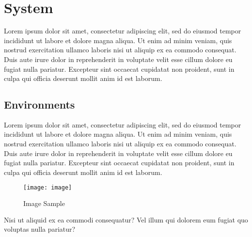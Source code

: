 \section{System}

Lorem ipsum dolor sit amet, consectetur adipiscing elit, sed do eiusmod tempor incididunt ut labore et dolore magna aliqua. Ut enim ad minim veniam, quis nostrud exercitation ullamco laboris nisi ut aliquip ex ea commodo consequat. Duis aute irure dolor in reprehenderit in voluptate velit esse cillum dolore eu fugiat nulla pariatur. Excepteur sint occaecat cupidatat non proident, sunt in culpa qui officia deserunt mollit anim id est laborum.


\subsection{Environments}

Lorem ipsum dolor sit amet, consectetur adipiscing elit, sed do eiusmod tempor incididunt ut labore et dolore magna aliqua. Ut enim ad minim veniam, quis nostrud exercitation ullamco laboris nisi ut aliquip ex ea commodo consequat. Duis aute irure dolor in reprehenderit in voluptate velit esse cillum dolore eu fugiat nulla pariatur. Excepteur sint occaecat cupidatat non proident, sunt in culpa qui officia deserunt mollit anim id est laborum.


\hfill

\begin{figure}[h]
\caption{Image Sample}
\centering
\texttt{[image: image]}
\end{figure}

\hfill


Nisi ut aliquid ex ea commodi consequatur? Vel illum qui dolorem eum fugiat quo voluptas nulla pariatur?


